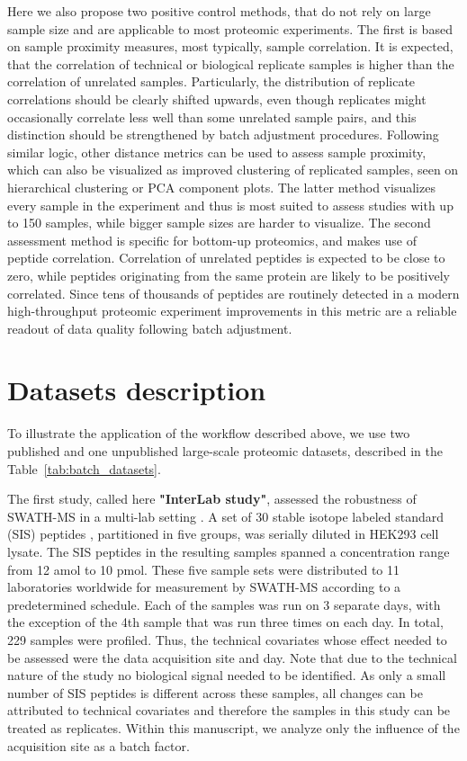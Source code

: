 \documentclass[num-refs]{wiley-article}
\begin{document}
Here we also propose two positive control methods, that do not rely on large sample size and are applicable to most proteomic experiments. The first is based on sample proximity measures, most typically, sample correlation. It is expected, that the correlation of technical or biological replicate samples  is higher than the correlation of unrelated samples. Particularly, the distribution of replicate correlations should be clearly shifted upwards, even though replicates might occasionally correlate less well than some unrelated sample pairs, and this distinction should be strengthened by batch adjustment procedures. Following similar logic, other distance metrics can be used to assess sample proximity, which can also be visualized as improved clustering of replicated samples, seen on hierarchical clustering or PCA component plots. The latter method visualizes every sample in the experiment and thus is most suited to assess studies with up to 150 samples, while bigger sample sizes are harder to visualize.
The second assessment method is specific for bottom-up proteomics, and makes use of peptide correlation. Correlation of unrelated peptides is expected to be close to zero, while peptides originating from the same protein are likely to be positively correlated. Since tens of thousands of peptides are routinely detected in a modern high-throughput proteomic experiment improvements in this metric are a reliable readout of data quality following batch adjustment.

\section{Datasets description}\label{subsec:datasets}

To illustrate the application of the workflow described above, we use two published and one unpublished large-scale proteomic datasets, described in the Table~\ref{tab:batch_datasets}. 

The first study, called here \textbf{"InterLab study"}, assessed the robustness of SWATH-MS in a multi-lab setting \cite{Collins2017}. A set of 30 stable isotope labeled standard (SIS) peptides \cite{Ebhardt2012}, partitioned in five groups, was serially diluted in HEK293 cell lysate. The SIS peptides in the resulting samples spanned a concentration range from 12 amol to 10 pmol. These five sample sets were distributed to 11 laboratories worldwide for measurement by SWATH-MS according to a predetermined schedule. Each of the samples was run on 3 separate days, with the exception of the 4th sample that was run three times on each day. In total, 229 samples were profiled. Thus, the technical covariates whose effect needed to be assessed were the data acquisition site and day. Note that due to the technical nature of the study no biological signal needed to be identified. As only a small number of SIS peptides is different across these samples, all changes can be attributed to technical covariates and therefore the samples in this study can be treated as replicates. Within this manuscript, we analyze only the influence of the acquisition site as a batch factor.
\end{document}
